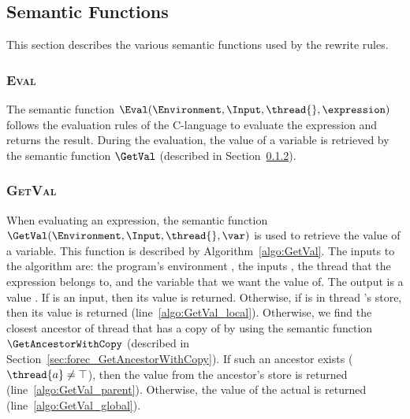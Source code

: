 
\subsection{Semantic Functions}
This section describes the various semantic functions 
used by the rewrite rules.

\subsubsection{\textsc{Eval}}
\label{sec:forec_Eval}
The semantic function $\Eval(\Environment, \Input, \thread{}, \expression)$ 
follows the evaluation rules of the C-language to 
evaluate the expression \expression{} and returns 
the result. During the evaluation, the value of a 
variable is retrieved by the semantic function $\GetVal$ 
(described in Section~\ref{sec:forec_GetVal}).

\subsubsection{\textsc{GetVal}}
\label{sec:forec_GetVal}
When evaluating an expression, the semantic function
$\GetVal(\Environment, \Input, \thread{}, \var)$ is used 
to retrieve the value of a variable. 
This function is described by Algorithm~\ref{algo:GetVal}. 
The inputs to the algorithm are: the program's environment 
\Environment{}, the inputs \Input{}, the thread \thread{} that the expression 
belongs to, and the variable \var{} that we want the value 
of. The output is a value \val{}. If \var{} is an input, 
then its value is returned. Otherwise, if \var{} is in thread 
\thread{}'s store, then its value is returned 
(line~\ref{algo:GetVal_local}). Otherwise, we find the closest ancestor of
thread \thread{} that has a copy of \var{} by using the
semantic function $\GetAncestorWithCopy$ 
(described in Section~\ref{sec:forec_GetAncestorWithCopy}). 
If such an ancestor exists ($\thread{a} \neq \top$), then
the value from the ancestor's store is returned (line~\ref{algo:GetVal_parent}). 
Otherwise, the value of the actual \var{} is returned
(line~\ref{algo:GetVal_global}).

